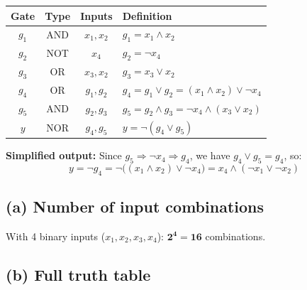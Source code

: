 \documentclass[12pt]{article}
\begin{document}
\medskip
\begin{center}
\begin{tabular}{|c|c|c|l|}
\hline
Gate & Type & Inputs  & Definition \\
\hline
$g_1$ & AND & $x_1,x_2$    & $g_1 = x_1 \land x_2$ \\
$g_2$ & NOT & $x_4$        & $g_2 = \lnot x_4$ \\
$g_3$ & OR  & $x_3,x_2$    & $g_3 = x_3 \lor x_2$ \\
$g_4$ & OR  & $g_1,g_2$    & $g_4 = g_1 \lor g_2 = (x_1\land x_2)\lor\lnot x_4$ \\
$g_5$ & AND & $g_2,g_3$    & $g_5 = g_2 \land g_3 = \lnot x_4\land(x_3\lor x_2)$ \\
$y$   & NOR & $g_4,g_5$    & $y = \lnot(g_4\lor g_5)$ \\
\hline
\end{tabular}
\end{center}

\medskip
\textbf{Simplified output:}  Since $g_5 \Rightarrow \lnot x_4 \Rightarrow g_4$,
we have $g_4 \lor g_5 = g_4$, so:
\[
y = \lnot g_4 = \lnot\bigl((x_1\land x_2)\lor\lnot x_4\bigr)
  = x_4 \land (\lnot x_1\lor\lnot x_2)
\]

\subsection*{(a) Number of input combinations}

With 4 binary inputs ($x_1,x_2,x_3,x_4$): $\mathbf{2^4 = 16}$ combinations.

\subsection*{(b) Full truth table}
\end{document}
